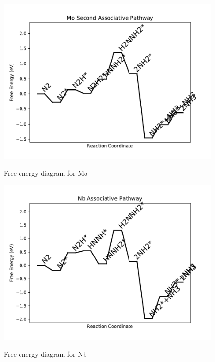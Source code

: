 \documentclass{article}
\begin{document}
\begin{figure}
\includegraphics[width=1\linewidth]{data/plots/Mo_associative_2.pdf}
\label{fig:Mo_associative_2}
\caption{Free energy diagram for Mo}
\end{figure}

\clearpage
\begin{figure}
\includegraphics[width=1\linewidth]{data/plots/Nb_associative.pdf}
\label{fig:Nb_associative}
\caption{Free energy diagram for Nb}
\end{figure}
\end{document}
